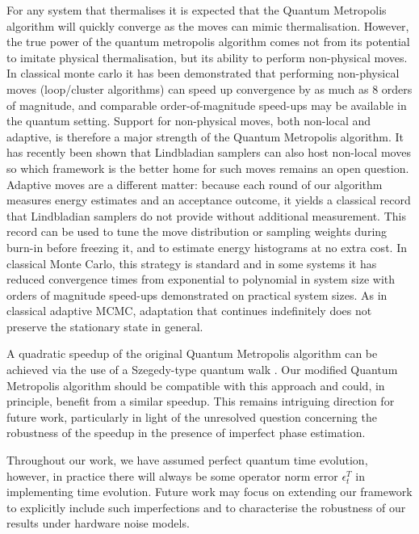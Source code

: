 For any system that thermalises it is expected that the Quantum Metropolis algorithm will quickly converge as the moves can mimic thermalisation. However, the true power of the quantum metropolis algorithm comes not from its potential to imitate physical thermalisation, but its ability to perform non-physical moves. In classical monte carlo it has been demonstrated \cite{blote2002cluster,todo2019parallel} that performing non-physical moves (loop/cluster algorithms) can speed up convergence by as much as 8 orders of magnitude, and comparable order-of-magnitude speed-ups may be available in the quantum setting. Support for non-physical moves, both non-local and adaptive, is therefore a major strength of the Quantum Metropolis algorithm. It has recently been shown that Lindbladian samplers can also host non-local moves \cite{chen2025efficient} so which framework is the better home for such moves remains an open question. Adaptive moves are a different matter: because each round of our algorithm measures energy estimates and an acceptance outcome, it yields a classical record that Lindbladian samplers do not provide without additional measurement. This record can be used to tune the move distribution or sampling weights during burn-in before freezing it, and to estimate energy histograms at no extra cost. In classical Monte Carlo, this strategy is standard and in some systems it has reduced convergence times from exponential to polynomial in system size \cite{berg1992multicanonical} with orders of magnitude speed-ups demonstrated on practical system sizes. As in classical adaptive MCMC, adaptation that continues indefinitely does not preserve the stationary state in general.

A quadratic speedup \cite{yung2012quantum} of the original Quantum Metropolis algorithm can be achieved via the use of a Szegedy-type quantum walk \cite{szegedy2004quantum}. Our modified Quantum Metropolis algorithm should be compatible with this approach and could, in principle, benefit from a similar speedup. This remains intriguing direction for future work, particularly in light of the unresolved question concerning the robustness of the speedup in the presence of imperfect phase estimation. 

Throughout our work, we have assumed perfect quantum time evolution, however, in practice there will always be some operator norm error $\epsilon^T_t$ in implementing time evolution. Future work may focus on extending our framework to explicitly include such imperfections and to characterise the robustness of our results under hardware noise models.